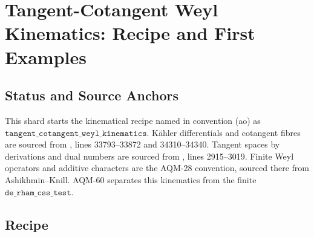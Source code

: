 
\section{Tangent-Cotangent Weyl Kinematics: Recipe and First Examples}
\label{sec:tangent-cotangent-weyl-kinematics-examples}

\subsection{Status and Source Anchors}

\begin{sloppypar}
This shard starts the kinematical recipe named in convention (ao) as
\(\texttt{tangent\_cotangent\_weyl\_kinematics}\).  K\"ahler differentials and
cotangent fibres are sourced from
, lines
33793--33872 and 34310--34340.  Tangent spaces by derivations and dual numbers
are sourced from
, lines
2915--3019.  Finite Weyl operators and additive characters are the AQM-28
convention, sourced there from Ashikhmin--Knill.  AQM-60 separates this
kinematics from the finite \(\texttt{de\_rham\_css\_test}\).
\end{sloppypar}

\subsection{Recipe}

